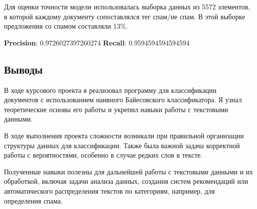 \documentclass[12pt]{article}
\begin{document}
Для оценки точности модели использовалась выборка данных из 5572 элементов, в которой каждому документу сопоставлялся тег спам/не спам.
В этой выборке предложения со спамом составляли 13\%.

\textbf{Precision}:  0.9726027397260274
\textbf{Recall}:  0.9594594594594594

\subsection*{Выводы}

В ходе курсового проекта я реализовал программу для классификации документов
с использованием наивного Байесовского классификатора.
Я узнал теоретические основы его работы и укрепил
навыки работы с текстовыми данными. 

В ходе выполнения проекта сложности возникали при правильной организации
структуры данных для классификации. Также была важной задача корректной работы
с вероятностями, особенно в случае редких слов в тексте.

Полученные навыки полезны для дальнейшей работы с текстовыми данными
и их обработкой, включая задачи анализа данных, создания систем рекомендаций
или автоматического распределения текстов по категориям, например, для определения спама.
\end{document}
